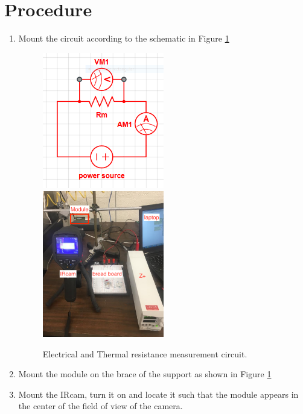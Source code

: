 \documentclass[12pt]{unlsilabsop}
\begin{document}
\section{Procedure}

\begin{enumerate}
    \item Mount the circuit according to the schematic in Figure \ref{Rm_circuit}
      \begin{center}
        \begin{figure}[h]
          \includegraphics[width=0.5\textwidth]{img/Rm_circuit.png}
          \includegraphics[width=0.5\textwidth]{img/setup.png}
          \caption{Electrical and Thermal resistance measurement circuit.}
          \label{Rm_circuit}
        \end{figure}
      \end{center}
    \item Mount the module on the brace of the support as shown in Figure \ref{Rm_circuit}
    \item Mount the IRcam, turn it on and locate it such that the module appears in the center of the field of view of the camera.

\end{enumerate}
\end{document}
